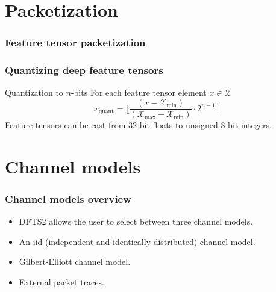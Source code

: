\documentclass[aspectratio=169]{beamer}
\begin{document}
\section{Packetization}
\begin{frame}
    \frametitle{Feature tensor packetization}
\end{frame}

\begin{frame}
	\frametitle{Quantizing deep feature tensors}
	\begin{block}{Quantization to $n$-bits}
		For each feature tensor element $x \in \mathcal{X}$
		\[
		x_{\text{quant}} = \Bigg \lfloor \frac{(x - \mathcal{X}_{\text{min}})}{( \mathcal{X}_{\text{max}} -  \mathcal{X}_{\text{min}})} \cdot 2^{n-1} \Bigg \rceil
		\]
		Feature tensors can be cast from 32-bit floats to unsigned 8-bit integers.
	\end{block}
\end{frame}

\section{Channel models}
\begin{frame}
\frametitle{Channel models overview}
\begin{itemize}
		\item DFTS2 allows the user to select between three channel models.
		\item An iid (independent and identically distributed) channel model.
		\item Gilbert-Elliott channel model.
		\item External packet traces.
	\end{itemize}
\end{frame}
\end{document}
